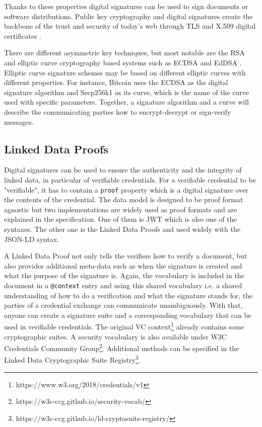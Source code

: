 Thanks to these properties digital signatures can be used to sign documents or software distributions. Public key cryptography and digital signatures create the backbone of the trust and security of today's web through \acrfull{TLS} \parencite{rfc8446} and X.509 digital certificates \parencite{rfc5280}.

There are different asymmetric key techniques, but most notable are the RSA \parencite{rivest1978method} and elliptic curve cryptography based systems such as \acrshort{ECDSA} \parencite{johnson2001elliptic} and \acrshort{EdDSA} \parencite{rfc8032}. Elliptic curve signature schemes may be based on different elliptic curves with different properties. For instance, Bitcoin uses the \acrshort{ECDSA} as the digital signature algorithm and Secp256k1 as its curve, which is the name of the curve used with specific parameters. Together, a signature algorithm and a curve will describe the communicating parties how to encrypt-decrypt or sign-verify messages.   

\subsection{Linked Data Proofs}

Digital signatures can be used to ensure the authenticity and the integrity of linked data, in particular of verifiable credentials. For a verifiable credential to be "verifiable", it has to contain a \lstinline{proof} property which is a digital signature over the contents of the credential. The data model is designed to be proof format agnostic but two implementations are widely used as proof formats and are explained in the specification. One of them is \acrshort{JWT} which is also one of the syntaxes. The other one is the Linked Data Proofs \parencite{ldproofs} and used widely with the \acrshort{JSON-LD} syntax. 

A Linked Data Proof not only tells the verifiers how to verify a document, but also provides additional meta-data such as when the signature is created and what the purpose of the signature is. Again, the vocabulary is included in the document in a \lstinline{@context} entry and using this shared vocabulary i.e. a shared understanding of how to do a verification and what the signature stands for, the parties of a credential exchange can communicate unambiguously. With that, anyone can create a signature suite and a corresponding vocabulary that can be used in verifiable credentials. The original \acrshort{VC} context\footnote{https://www.w3.org/2018/credentials/v1} already contains some cryptographic suites. A security vocabulary is also available under W3C Credentials Community Group\footnote{https://w3c-ccg.github.io/security-vocab/}. Additional methods can be specified in the Linked Data Cryptographic Suite Registry\footnote{https://w3c-ccg.github.io/ld-cryptosuite-registry/}.

